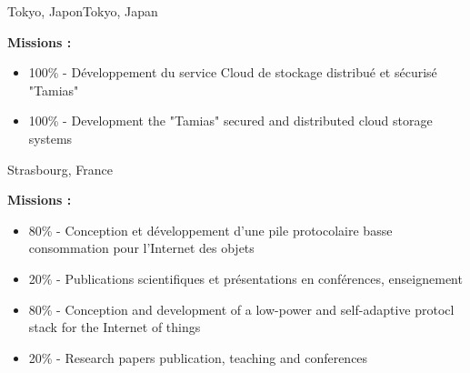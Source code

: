 \vspace{\ItemsSpacing}

{}{}{\ifnativelang Tokyo, Japon\else Tokyo, Japan\fi}{
\textbf{Missions :} 
\begin{itemize}
\ifnativelang
\item 100\% - D\'eveloppement du service Cloud de stockage distribu\'e et s\'ecuris\'e "Tamias"
\else
\item 100\% - Development the "Tamias" secured and distributed cloud storage systems
\fi
\end{itemize}
}

\vspace{\ItemsSpacing}

{}{}{Strasbourg, France}{
\textbf{Missions :} 
\begin{itemize}
\ifnativelang
\item 80\% - Conception et d\'eveloppement d'une pile protocolaire basse consommation pour l'Internet des objets
\item 20\% - Publications scientifiques et pr\'esentations en conf\'erences, enseignement
\else
\item 80\% - Conception and development of a low-power and self-adaptive protocl stack for the Internet of things
\item 20\% - Research papers publication, teaching and conferences
\fi
\end{itemize}
}


